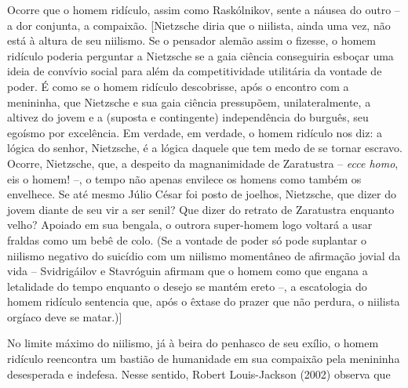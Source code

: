 Ocorre que o homem ridículo, assim como Raskólnikov, sente a náusea do
outro -- a dor conjunta, a compaixão. {[}Nietzsche diria que o niilista,
ainda uma vez, não está à altura de seu niilismo. Se o pensador alemão
assim o fizesse, o homem ridículo poderia perguntar a Nietzsche se a
gaia ciência conseguiria esboçar uma ideia de convívio social para além
da competitividade utilitária da vontade de poder. É como se o homem
ridículo descobrisse, após o encontro com a menininha, que Nietzsche e
sua gaia ciência pressupõem, unilateralmente, a altivez do jovem e a
(suposta e contingente) independência do burguês, seu egoísmo por
excelência. Em verdade, em verdade, o homem ridículo nos diz: a lógica
do senhor, Nietzsche, é a lógica daquele que tem medo de se tornar
escravo. Ocorre, Nietzsche, que, a despeito da magnanimidade de
Zaratustra -- \emph{ecce homo}, eis o homem! --, o tempo não apenas
envilece os homens como também os envelhece. Se até mesmo Júlio César
foi posto de joelhos, Nietzsche, que dizer do jovem diante de seu vir a
ser senil? Que dizer do retrato de Zaratustra enquanto velho? Apoiado em
sua bengala, o outrora super-homem logo voltará a usar fraldas como um
bebê de colo. (Se a vontade de poder só pode suplantar o niilismo
negativo do suicídio com um niilismo momentâneo de afirmação jovial da
vida -- Svidrigáilov e Stavróguin afirmam que o homem como que engana a
letalidade do tempo enquanto o desejo se mantém ereto --, a escatologia
do homem ridículo sentencia que, após o êxtase do prazer que não
perdura, o niilista orgíaco deve se matar.){]}

No limite máximo do niilismo, já à beira do penhasco de seu exílio, o
homem ridículo reencontra um bastião de humanidade em sua compaixão pela
menininha desesperada e indefesa. Nesse sentido, Robert Louis-Jackson
(2002) observa que

